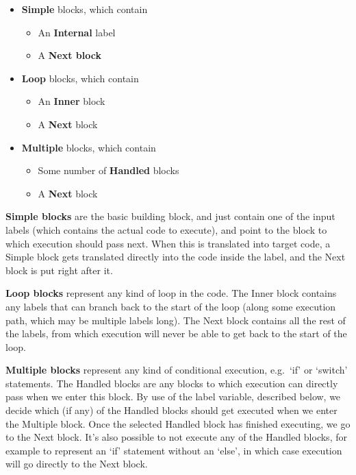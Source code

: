 \documentclass[10pt, a4paper]{article}
\begin{document}
\begin{itemize}
\item \textbf{Simple} blocks, which contain
\begin{itemize}
\item An \textbf{Internal} label
\item A \textbf{Next block}
\end{itemize}

\item \textbf{Loop} blocks, which contain
\begin{itemize}
\item An \textbf{Inner} block
\item A \textbf{Next} block
\end{itemize}

\item \textbf{Multiple} blocks, which contain
\begin{itemize}
\item Some number of \textbf{Handled} blocks
\item A \textbf{Next} block
\end{itemize}
\end{itemize}

\textbf{Simple blocks} are the basic building block, and just contain one of the input labels (which contains the actual code to execute), and point to the block to which execution should pass next.
When this is translated into target code, a Simple block gets translated directly into the code inside the label, and the Next block is put right after it.

\textbf{Loop blocks} represent any kind of loop in the code.
The Inner block contains any labels that can branch back to the start of the loop (along some execution path, which may be multiple labels long).
The Next block contains all the rest of the labels, from which execution will never be able to get back to the start of the loop.

\textbf{Multiple blocks} represent any kind of conditional execution, e.g.\ `if' or `switch' statements.
The Handled blocks are any blocks to which execution can directly pass when we enter this block.
By use of the label variable, described below, we decide which (if any) of the Handled blocks should get executed when we enter the Multiple block.
Once the selected Handled block has finished executing, we go to the Next block.
It's also possible to not execute any of the Handled blocks, for example to represent an `if' statement without an `else', in which case execution will go directly to the Next block.


\printbibliography
\end{document}
